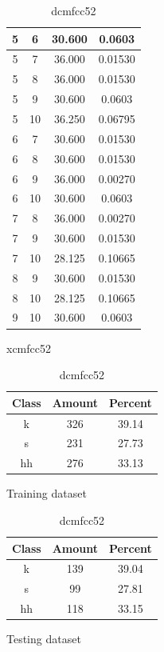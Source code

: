 \begin{table}
\begin{subtable}[tbp]{0.45\textwidth}
{\begin{tabular}{|c|c|c|c|}
 5 & 6 & 30.600 & 0.0603\\ \hline 
 5 & 7 & 36.000 & 0.01530\\ \hline 
 5 & 8 & 36.000 & 0.01530\\ \hline 
 5 & 9 & 30.600 & 0.0603\\ \hline 
 5 & 10 & 36.250 & 0.06795\\ \hline 
 6 & 7 & 30.600 & 0.01530\\ \hline 
 6 & 8 & 30.600 & 0.01530\\ \hline 
 6 & 9 & 36.000 & 0.00270\\ \hline 
 6 & 10 & 30.600 & 0.0603\\ \hline 
 7 & 8 & 36.000 & 0.00270\\ \hline 
 7 & 9 & 30.600 & 0.01530\\ \hline 
 7 & 10 & 28.125 & 0.10665\\ \hline 
 8 & 9 & 30.600 & 0.01530\\ \hline 
 8 & 10 & 28.125 & 0.10665\\ \hline 
 9 & 10 & 30.600 & 0.0603\\ \hline 

\end{tabular}
} \caption{xcmfcc52}\label{xlmfcc52}

\end{subtable}

\begin{subtable}[tbp]{0.45\textwidth}
\centering
\begin{tabular}{|c|c|c|}
\hline
Class & Amount & Percent\\ \hline
k & 326 & 39.14\\ \hline
s & 231 & 27.73\\ \hline
hh & 276 & 33.13\\ \hline
\end{tabular}
\caption{Training dataset}
\end{subtable}
\hfill
\begin{subtable}[tbp]{0.45\textwidth}
\centering
\begin{tabular}{|c|c|c|}
\hline
Class & Amount & Percent\\ \hline
k & 139 & 39.04\\ \hline
s & 99 & 27.81\\ \hline
hh & 118 & 33.15\\ \hline
\end{tabular}
\caption{Testing dataset}
\end{subtable}
\hfill


\caption{dcmfcc52}

\label{dlmfcc52}
\end{table}\clearpage
